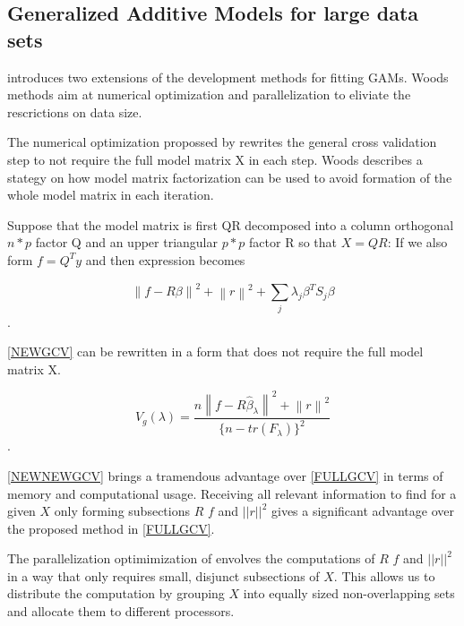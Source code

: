 \documentclass{article}
\begin{document}
    \subsection{Generalized Additive Models for large data sets}
    \cite{bigdataGAM} introduces two extensions of the development methods for fitting GAMs. Woods methods aim at numerical optimization and parallelization to eliviate the rescrictions on data size.

    The numerical optimization propossed by \cite{bigdataGAM} rewrites the general cross validation step to not require the full model matrix X in each step. Woods describes a stategy on how model matrix factorization can be used to avoid formation of the whole model matrix in each iteration.

    Suppose that the model matrix is first QR decomposed into a column orthogonal $n * p$ factor Q and an upper triangular $p * p$ factor R so that $X=QR$: If we also form $f =Q^Ty$ and then expression \label{finalsmooth} becomes

    \begin{equation} \label{NEWGCV} \left \| f- R\beta \right \|^2 + \left \| r \right \|^2 + \sum_{j}^{ } \lambda_j \beta^T S_j \beta \end{equation}.

    \ref{NEWGCV} can be rewritten in a form that does not require the full model matrix X.

    \begin{equation} \label{NEWNEWGCV} V_g(\lambda) = \frac{n\left \| f-R\widehat{\beta}_\lambda \right \| ^2 + \left  \| r \right \| ^2}{\{n-tr(F_\lambda) \}^2} \end{equation}.

    \ref{NEWNEWGCV} brings a tramendous advantage over \ref{FULLGCV} in terms of memory and computational usage. Receiving all relevant information to find \textlambda for a given $X$ only forming subsections $R$ $f$ and $||r||^2$ gives a significant advantage over the proposed method in \ref{FULLGCV}.

    The parallelization optimimization of \label{FULLGCV} envolves the computations of $R$ $f$ and $||r||^2$ in a way that only requires small, disjunct subsections of $X$. This allows us to distribute the computation by grouping $X$ into equally sized non-overlapping sets and allocate them to different processors.
\end{document}
